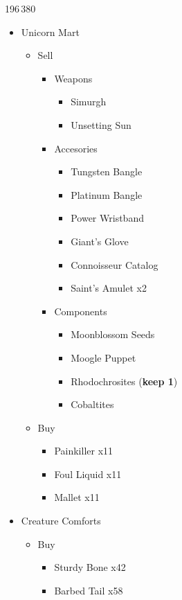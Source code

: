 \begin{shop}{196\,380}
	\begin{itemize}
		\item Unicorn Mart
			\begin{itemize}
				\item Sell
					\begin{itemize}
						\item Weapons
							\begin{itemize}
								\item Simurgh
								\item Unsetting Sun
							\end{itemize}
						\item Accesories
							\begin{itemize}
								\item Tungsten Bangle
								\item Platinum Bangle
								\item Power Wristband
								\item Giant's Glove
								\item Connoisseur Catalog
								\item Saint's Amulet x2
							\end{itemize}
						\item Components
							\begin{itemize}
								\item Moonblossom Seeds
								\item Moogle Puppet
								\item Rhodochrosites (\textbf{keep 1})
								\item Cobaltites
							\end{itemize}
					\end{itemize}
				\item Buy
					\begin{itemize}
						\item Painkiller x11
						\item Foul Liquid x11
						\item Mallet x11
					\end{itemize}
			\end{itemize}
		\item Creature Comforts
			\begin{itemize}
				\item Buy
					\begin{itemize}
						\item Sturdy Bone x42
						\item Barbed Tail x58

\end{itemize}
\end{itemize}
\end{itemize}
\end{shop}
